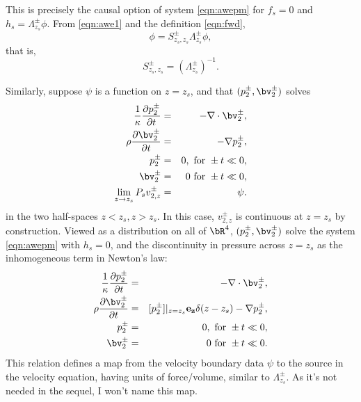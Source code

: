 This is precisely the causal option of system \ref{eqn:awepm} for
$f_s=0$ and $h_s=\Lambda^{\pm}_{z_s}\phi$. From \ref{eqn:awe1} and the definition
\ref{eqn:fwd},
\begin{equation}
  \label{eqn:lamfwd}
  \phi = S^{\pm}_{z_s,z_s}\Lambda^{\pm}_{z_s}\phi,
\end{equation}
that is,
\begin{equation}
  \label{eqn:lamfwd1}
  S^{\pm}_{z_s,z_s} = (\Lambda^{\pm}_{z_s})^{-1}.
\end{equation}

Similarly, suppose $\psi$ is a function on $z=z_s$, and that
$(p^{\pm}_2,\bv^{\pm}_2)$ solves
\begin{eqnarray}
\label{eqn:awe2}
  \frac{1}{\kappa}\frac{\partial p^{\pm}_2}{\partial t} & = & - \nabla \cdot \bv^{\pm}_2, \nonumber \\
  \rho\frac{\partial \bv^{\pm}_2}{\partial t} & = & - \nabla p^{\pm}_2,\nonumber \\
  p^{\pm}_2 & =& 0,  \mbox{ for } \pm t \ll 0,\nonumber\\ 
  \bv^{\pm}_2 & = & 0 \mbox{ for } \pm t \ll 0,\nonumber\\
  \lim_{z \rightarrow z_s} P_sv^{\pm}_{2,z} &=& \psi.
\end{eqnarray}
in the two half-spaces $z<z_s, z > z_s$. In this case, $v^{\pm}_{2,z}$
is continuous at $z=z_s$ by construction. Viewed as a
distribution on all of $\bR^4$, $(p^{\pm}_2,\bv^{\pm}_2)$ solve the
system \ref{eqn:awepm} with $h_s=0$, and the discontinuity in pressure
across $z=z_s$ as the inhomogeneous term in Newton's law:
\begin{eqnarray}
\label{eqn:sawe2}
  \frac{1}{\kappa}\frac{\partial p^{\pm}_2}{\partial t} & = &
                                                        - \nabla \cdot \bv^{\pm}_2, \nonumber \\
  \rho\frac{\partial \bv^{\pm}_2}{\partial t} & = & 
                                                    [p^{\pm}_2]|_{z=z_s}{\bf e_z}\delta(z-z_s) - \nabla p^{\pm}_2,\nonumber \\
  p^{\pm}_2 & =& 0,  \mbox{ for } \pm t \ll 0,\nonumber\\ 
  \bv^{\pm}_2 & = & 0 \mbox{ for } \pm t \ll 0.
\end{eqnarray}
This relation defines a map from the velocity boundary data $\psi$ to
the source in the velocity equation, having units of force/volume,
similar to $\Lambda^{\pm}_{z_s}$. As it's not needed in the sequel, I
won't name this map.

